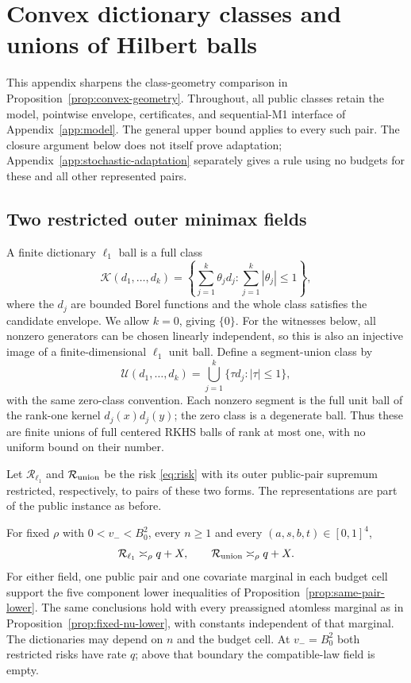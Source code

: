 \section{Convex dictionary classes and unions of Hilbert balls}
\label{app:convex-geometry}

This appendix sharpens the class-geometry comparison in
Proposition~\ref{prop:convex-geometry}. Throughout, all public classes retain
the model, pointwise envelope, certificates, and sequential-M1 interface
of Appendix~\ref{app:model}. The general upper bound applies to every such
pair. The closure argument below does not itself prove adaptation;
Appendix~\ref{app:stochastic-adaptation} separately gives a rule
using no budgets for these and all other represented pairs.

\subsection{Two restricted outer minimax fields}

A finite dictionary $\ell_1$ ball is a full class
\[
 \mathcal K(d_1,\ldots,d_k)
 =\left\{\sum_{j=1}^k\theta_jd_j:\sum_{j=1}^k|\theta_j|\le1\right\},
\]
where the $d_j$ are bounded Borel functions and the whole class satisfies
the candidate envelope. We allow $k=0$, giving $\{0\}$.
For the witnesses below, all nonzero generators can be chosen
linearly independent, so this is also an injective image of a
finite-dimensional $\ell_1$ unit ball. Define a segment-union class by
\[
 \mathcal U(d_1,\ldots,d_k)=\bigcup_{j=1}^k\{\tau d_j:|\tau|\le1\},
\]
with the same zero-class convention. Each nonzero segment is the full
unit ball of the rank-one kernel $d_j(x)d_j(y)$; the zero class is a
degenerate ball. Thus these are finite unions of full centered RKHS
balls of rank at most one, with no uniform bound on their number.

Let $\mathcal R_{\ell_1}$ and $\mathcal R_{\rm union}$ be the risk
\eqref{eq:risk} with its outer public-pair supremum restricted,
respectively, to pairs of these two forms. The representations
are part of the public instance as before.
\begin{theorem}
\label{thm:convex-geometry}
For fixed $\rho$ with $0<v_-<B_0^2$, every $n\ge1$ and every
$(a,s,b,t)\in[0,1]^4$,
\[
 \mathcal R_{\ell_1}\asymp_\rho q+X,\qquad
 \mathcal R_{\rm union}\asymp_\rho q+X.
\]
For either field, one public pair and one covariate marginal in each
budget cell support the five component lower inequalities of
Proposition~\ref{prop:same-pair-lower}. The same conclusions hold with
every preassigned atomless marginal as in
Proposition~\ref{prop:fixed-nu-lower}, with constants independent of that
marginal. The dictionaries may depend on $n$ and the budget cell.
At $v_-=B_0^2$ both restricted risks have rate $q$; above that boundary
the compatible-law field is empty.
\end{theorem}

